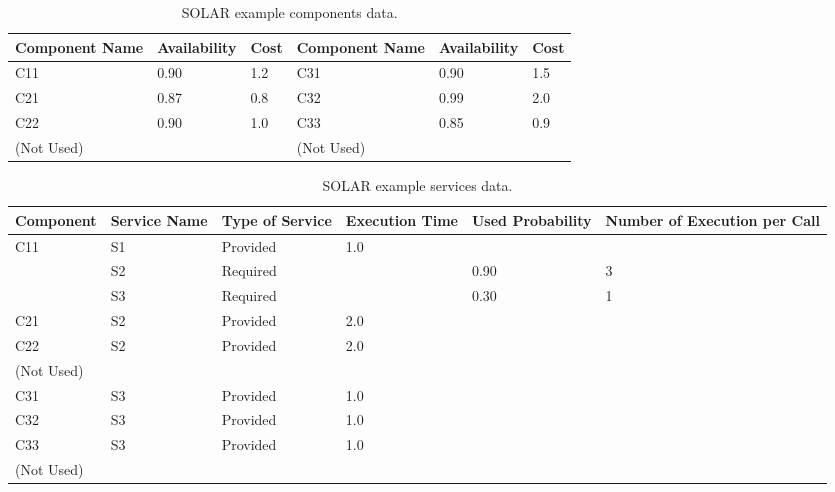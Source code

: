 \begin{table}[ht!b]
	\centering
	\begin{tabular}{|p{2cm}|p{2cm}|p{1cm}||p{2cm}|p{2cm}|p{1cm}|}
		\hline 
		\textbf{Component Name} & \textbf{Availability} & \textbf{Cost} & \textbf{Component Name} & \textbf{Availability} & \textbf{Cost} \\ 
		\hline 
		C11 & 0.90 & 1.2 & C31 & 0.90 & 1.5 \\
		\hline 
		C21 & 0.87 & 0.8 & C32 & 0.99 & 2.0 \\ 
		\hline 
		C22 & \multirow{2}{*}{0.90} & \multirow{2}{*}{1.0} & C33 & \multirow{2}{*}{0.85} & \multirow{2}{*}{0.9} \\ 
		(Not Used) & & & (Not Used) & & \\
		\hline 
	\end{tabular} 
	\caption[SOLAR Components Data]{SOLAR example components data.}
	\label{tab:solar-comp-specs}
\end{table}

\begin{table}[ht!b]
	\centering
	\begin{tabular}{|p{2cm}|p{2.5cm}|p{1.4cm}|p{1.7cm}|p{1.5cm}|p{1.8cm}|}
		\hline 
		\textbf{Component} & \textbf{Service Name} & \textbf{Type of Service} & \textbf{Execution Time} & \textbf{Used Probability} & \textbf{Number of Execution per Call} \\ 
		\hline 
		\multirow{3}{*}{C11} & S1 & Provided & 1.0 & & \\\cline{2-6}
		& S2 & Required & & 0.90 & 3 \\
		& S3 & Required & & 0.30 & 1 \\
		\hline 
		C21 & S2 & Provided & 2.0 & & \\
		\hline 
		C22 & \multirow{2}{*}{S2} & \multirow{2}{*}{Provided} & \multirow{2}{*}{2.0} & & \\
		(Not Used) & & & & & \\
		\hline 
		C31 & S3 & Provided & 1.0 & & \\
		\hline
		C32 & S3 & Provided & 1.0 & & \\
		\hline
		C33 & \multirow{2}{*}{S3} & \multirow{2}{*}{Provided} &\multirow{2}{*}{1.0} & & \\
		(Not Used) & & & & & \\
		\hline
	\end{tabular} 
	\caption[SOLAR Services Data]{SOLAR example services data.}
	\label{tab:solar-serv-specs}
\end{table}

